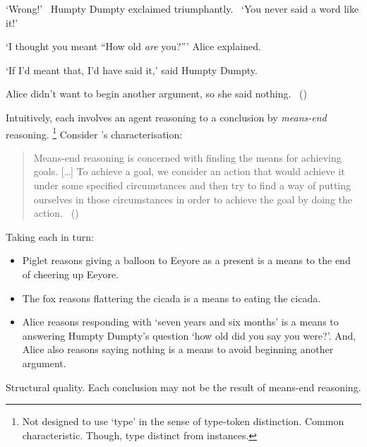 \begin{note}
\begin{scenario}
    \noindent%
    `Wrong!'~%
    Humpty Dumpty exclaimed triumphantly.~%
    `You never said a word like it!'

    \noindent%
    `I thought you meant ``How old \emph{are} you?'''
    Alice explained.

    \noindent%
    `If I'd meant that, I'd have said it,'
    said Humpty Dumpty.

    \noindent%
    Alice didn't want to begin another argument, so she said nothing.\newline
    \mbox{ }\hfill\mbox{(\cite[188]{Carroll:2009aa})}\newline
    \mbox{ }
  \end{scenario}
\end{note}

\begin{note}
  Intuitively, each  involves an agent reasoning to a conclusion by \emph{means-end} reasoning.%
  \footnote{
    Not designed to use `type' in the sense of type-token distinction.
    Common characteristic.
    Though, type distinct from instances.
  }
  Consider \citeauthor{Pollock:2002aa}'s characterisation:

  \begin{quote}
    Means-end reasoning is concerned with finding the means for achieving goals.
    [\dots]
    To achieve a goal, we consider an action that would achieve it under some specified circumstances and then try to find a way of putting ourselves in those circumstances in order to achieve the goal by doing the action.%
    \mbox{ }\hfill\mbox{(\citeyear[60]{Pollock:2002aa})}
  \end{quote}

  \noindent%
  Taking each  in turn:
  \begin{itemize}
  \item
    Piglet reasons giving a balloon to Eeyore as a present is a means to the end of cheering up Eeyore.
  \item
    The fox reasons flattering the cicada is a means to eating the cicada.
  \item
    Alice reasons responding with `seven years and six months' is a means to answering Humpty Dumpty's question `how old did you say you were?'.
    And, Alice also reasons saying nothing is a means to avoid beginning another argument.
  \end{itemize}

  \noindent%
  Structural quality.
  Each conclusion may not be the result of means-end reasoning.


\end{note}
